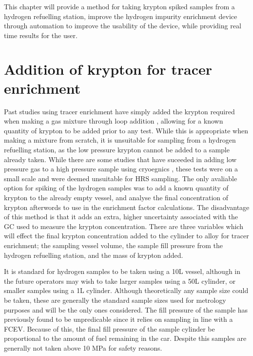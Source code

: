 This chapter will provide a method for taking krypton spiked samples from a hydrogen refuelling station, improve the hydrogen impurity enrichment device through automation to improve the usability of the device, while providing real time results for the user.

\section{Addition of krypton for tracer enrichment}\label{kryptonspike}
Past studies using tracer enrichment have simply added the krypton required when making a gas mixture through loop addition \cite{Murugan2014}, allowing for a known quantity of krypton to be added prior to any test. While this is appropriate when making a mixture from scratch, it is unsuitable for sampling from a hydrogen refuelling station, as the low pressure krypton cannot be added to a sample already taken. While there are some studies that have suceeded in adding low pressure gas to a high pressure sample using cryoegnics \cite{Podesta2017}, these tests were on a small scale and were deemed unsuitable for HRS sampling. The only avaliable option for spiking of the hydrogen samples was to add a known quantity of krypton to the already empty vessel, and analyse the final concentration of krypton afterwords to use in the enrichment factor calculations. The disadvantage of this method is that it adds an extra, higher uncertainty associated with the GC used to measure the krypton concentration. There are three variables which will effect the final krypton concentration added to the cylinder to alloy for tracer enrichment; the sampling vessel volume, the sample fill pressure from the hydrogen refuelling station, and the mass of krypton added.  

It is standard for hydrogen samples to be taken using a 10L vessel, although in the future operators may wish to take larger samples using a 50L cylinder, or smaller samples using a 1L cylinder. Although theoretically any sample size could be taken, these are generally the standard sample sizes used for metrology purposes and will be the only ones considered. The fill pressure of the sample has previously found to be unpredicable since it relies on sampling in line with a FCEV. Because of this, the final fill pressure of the sample cylinder be proportional to the amount of fuel remaining in the car. Despite this samples are generally not taken above 10 MPa for safety reasons. 

